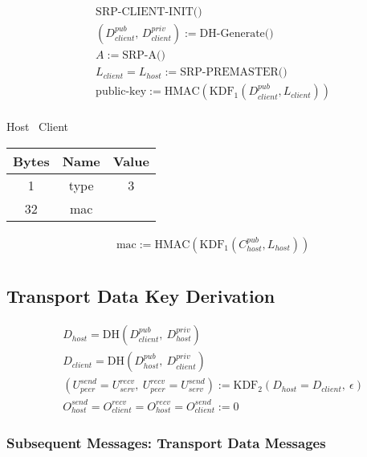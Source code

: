\documentclass{article}
\begin{document}
    \begin{align*}
        & \text{SRP-CLIENT-INIT()}\\
        & (D_{client}^{pub},\, D_{client}^{priv}) := \text{DH-Generate()}\\
        & A := \text{SRP-A()}\\
        & L_{client} = L_{host} := \text{SRP-PREMASTER()}\\
        & \text{public-key} := \text{HMAC}(\text{KDF}_1(D_{client}^{pub}, L_{client}))\\
    \end{align*}

    \begin{center}
        Host \textrightarrow\ Client\\
        \begin{tabular}{|c|c|c|}
            \hline
            \textbf{Bytes} & \textbf{Name} & \textbf{Value} \\
            \hline
            1              & type          & 3              \\
            \hline
            32             & mac           &                \\
            \hline
        \end{tabular}
    \end{center}

    \begin{align*}
        & \text{mac} := \text{HMAC}(\text{KDF}_1(C_{host}^{pub}, L_{host}))\\
    \end{align*}

    \subsection{Transport Data Key Derivation}

    \begin{align*}
        & D_{host} = \text{DH}(D_{client}^{pub},\ D_{host}^{priv})\\
        & D_{client} = \text{DH}(D_{host}^{pub},\ D_{client}^{priv})\\
        & (U_{peer}^{send} = U_{serv}^{recv},\ U_{peer}^{recv} = U_{serv}^{send}) := \text{KDF}_2(D_{host} = D_{client},
        \ \epsilon) \\
        & O_{host}^{send} = O_{client}^{recv} = O_{host}^{recv} = O_{client}^{send} := 0
    \end{align*}

    \subsubsection{Subsequent Messages: Transport Data Messages}
\end{document}
